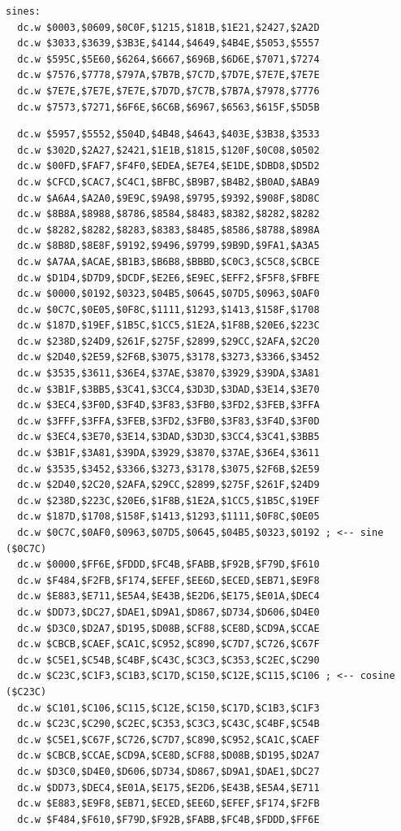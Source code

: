 \begin{lstlisting}
sines:
  dc.w $0003,$0609,$0C0F,$1215,$181B,$1E21,$2427,$2A2D
  dc.w $3033,$3639,$3B3E,$4144,$4649,$4B4E,$5053,$5557
  dc.w $595C,$5E60,$6264,$6667,$696B,$6D6E,$7071,$7274
  dc.w $7576,$7778,$797A,$7B7B,$7C7D,$7D7E,$7E7E,$7E7E
  dc.w $7E7E,$7E7E,$7E7E,$7D7D,$7C7B,$7B7A,$7978,$7776
  dc.w $7573,$7271,$6F6E,$6C6B,$6967,$6563,$615F,$5D5B
\end{lstlisting}
\begin{lstlisting}
  dc.w $5957,$5552,$504D,$4B48,$4643,$403E,$3B38,$3533
  dc.w $302D,$2A27,$2421,$1E1B,$1815,$120F,$0C08,$0502
  dc.w $00FD,$FAF7,$F4F0,$EDEA,$E7E4,$E1DE,$DBD8,$D5D2
  dc.w $CFCD,$CAC7,$C4C1,$BFBC,$B9B7,$B4B2,$B0AD,$ABA9
  dc.w $A6A4,$A2A0,$9E9C,$9A98,$9795,$9392,$908F,$8D8C
  dc.w $8B8A,$8988,$8786,$8584,$8483,$8382,$8282,$8282
  dc.w $8282,$8282,$8283,$8383,$8485,$8586,$8788,$898A
  dc.w $8B8D,$8E8F,$9192,$9496,$9799,$9B9D,$9FA1,$A3A5
  dc.w $A7AA,$ACAE,$B1B3,$B6B8,$BBBD,$C0C3,$C5C8,$CBCE
  dc.w $D1D4,$D7D9,$DCDF,$E2E6,$E9EC,$EFF2,$F5F8,$FBFE
  dc.w $0000,$0192,$0323,$04B5,$0645,$07D5,$0963,$0AF0 
  dc.w $0C7C,$0E05,$0F8C,$1111,$1293,$1413,$158F,$1708
  dc.w $187D,$19EF,$1B5C,$1CC5,$1E2A,$1F8B,$20E6,$223C
  dc.w $238D,$24D9,$261F,$275F,$2899,$29CC,$2AFA,$2C20
  dc.w $2D40,$2E59,$2F6B,$3075,$3178,$3273,$3366,$3452
  dc.w $3535,$3611,$36E4,$37AE,$3870,$3929,$39DA,$3A81
  dc.w $3B1F,$3BB5,$3C41,$3CC4,$3D3D,$3DAD,$3E14,$3E70
  dc.w $3EC4,$3F0D,$3F4D,$3F83,$3FB0,$3FD2,$3FEB,$3FFA
  dc.w $3FFF,$3FFA,$3FEB,$3FD2,$3FB0,$3F83,$3F4D,$3F0D 
  dc.w $3EC4,$3E70,$3E14,$3DAD,$3D3D,$3CC4,$3C41,$3BB5
  dc.w $3B1F,$3A81,$39DA,$3929,$3870,$37AE,$36E4,$3611
  dc.w $3535,$3452,$3366,$3273,$3178,$3075,$2F6B,$2E59
  dc.w $2D40,$2C20,$2AFA,$29CC,$2899,$275F,$261F,$24D9
  dc.w $238D,$223C,$20E6,$1F8B,$1E2A,$1CC5,$1B5C,$19EF
  dc.w $187D,$1708,$158F,$1413,$1293,$1111,$0F8C,$0E05
  dc.w $0C7C,$0AF0,$0963,$07D5,$0645,$04B5,$0323,$0192 ; <-- sine ($0C7C)
  dc.w $0000,$FF6E,$FDDD,$FC4B,$FABB,$F92B,$F79D,$F610 
  dc.w $F484,$F2FB,$F174,$EFEF,$EE6D,$ECED,$EB71,$E9F8
  dc.w $E883,$E711,$E5A4,$E43B,$E2D6,$E175,$E01A,$DEC4
  dc.w $DD73,$DC27,$DAE1,$D9A1,$D867,$D734,$D606,$D4E0
  dc.w $D3C0,$D2A7,$D195,$D08B,$CF88,$CE8D,$CD9A,$CCAE
  dc.w $CBCB,$CAEF,$CA1C,$C952,$C890,$C7D7,$C726,$C67F
  dc.w $C5E1,$C54B,$C4BF,$C43C,$C3C3,$C353,$C2EC,$C290
  dc.w $C23C,$C1F3,$C1B3,$C17D,$C150,$C12E,$C115,$C106 ; <-- cosine ($C23C)
  dc.w $C101,$C106,$C115,$C12E,$C150,$C17D,$C1B3,$C1F3
  dc.w $C23C,$C290,$C2EC,$C353,$C3C3,$C43C,$C4BF,$C54B
  dc.w $C5E1,$C67F,$C726,$C7D7,$C890,$C952,$CA1C,$CAEF
  dc.w $CBCB,$CCAE,$CD9A,$CE8D,$CF88,$D08B,$D195,$D2A7
  dc.w $D3C0,$D4E0,$D606,$D734,$D867,$D9A1,$DAE1,$DC27
  dc.w $DD73,$DEC4,$E01A,$E175,$E2D6,$E43B,$E5A4,$E711
  dc.w $E883,$E9F8,$EB71,$ECED,$EE6D,$EFEF,$F174,$F2FB
  dc.w $F484,$F610,$F79D,$F92B,$FABB,$FC4B,$FDDD,$FF6E 
\end{lstlisting}

